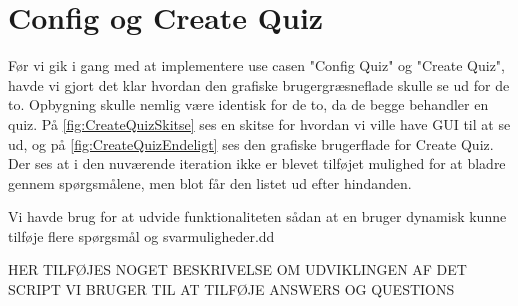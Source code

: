 \section{Config og Create Quiz}
Før vi gik i gang med at implementere use casen "Config Quiz" og "Create Quiz", havde vi gjort det klar hvordan den grafiske brugergræsneflade skulle se ud for de to. Opbygning skulle nemlig være identisk for de to, da de begge behandler en quiz. På \ref{fig:CreateQuizSkitse} ses en skitse for hvordan vi ville have GUI til at se ud, og på \ref{fig:CreateQuizEndeligt} ses den grafiske brugerflade for Create Quiz. Der ses at i den nuværende iteration ikke er blevet tilføjet mulighed for at bladre gennem spørgsmålene, men blot får den listet ud efter hindanden.

\begin{minipage}{0.45\textwidth}
\end{minipage}
\begin{minipage}{0.55\textwidth}
\end{minipage}

\vspace{6 mm}

Vi havde brug for at udvide funktionaliteten sådan at en bruger dynamisk kunne tilføje flere spørgsmål og svarmuligheder.dd

HER TILFØJES NOGET BESKRIVELSE OM UDVIKLINGEN AF DET SCRIPT VI BRUGER TIL AT TILFØJE ANSWERS OG QUESTIONS
